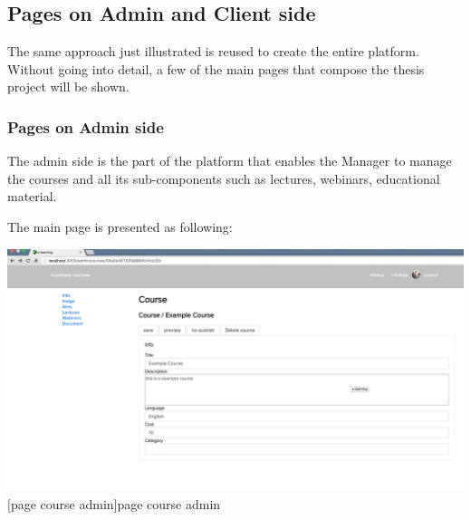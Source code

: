 




\subsection {Pages on Admin and Client side}
\label{subsec:pages}
The same approach just illustrated is reused to create the entire platform.
Without going into detail, a few of the main pages that compose the thesis project will be shown.

\subsubsection {Pages on Admin side}
\label{subsec:Admin_side}

The admin side is the part of the platform that enables the Manager to manage the courses and all its sub-components such as lectures, webinars, educational material.

The main page is presented as following:

\begin{minipage}{\linewidth}
    \centering
    \includegraphics[width=1.0\linewidth]{images/chapter4/page-course-admin.png}
    [page course admin]{page course admin}
\end{minipage}


